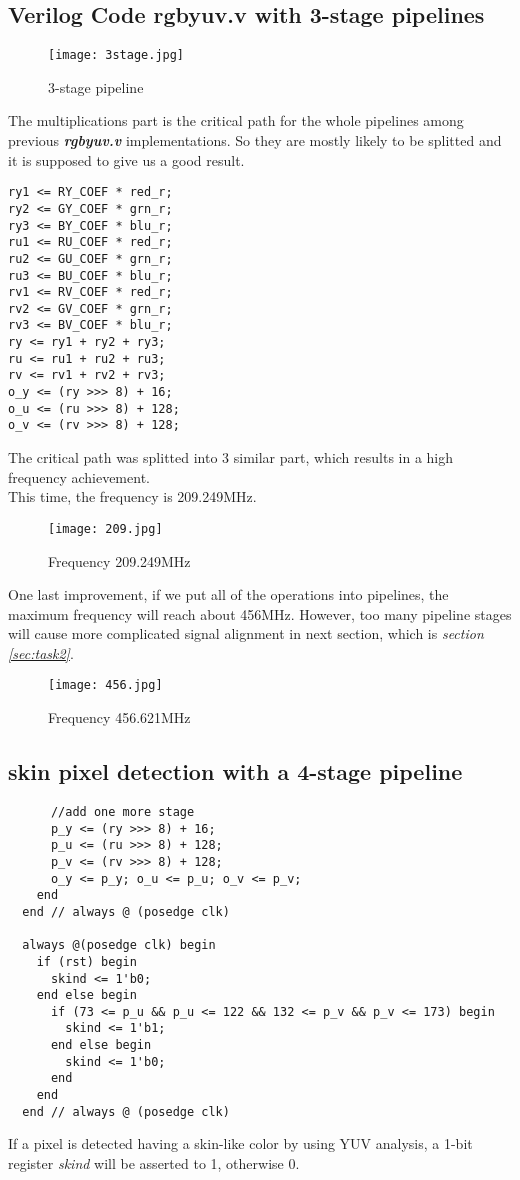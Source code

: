 \documentclass[12pt,fleqn]{article}
\begin{document}
\subsection{Verilog Code rgbyuv.v with 3-stage pipelines}
\begin{figure}[H]
\centering
\texttt{[image: 3stage.jpg]}
\caption{3-stage pipeline}
\end{figure}
The multiplications part is the critical path for the whole pipelines among previous \textbf{\emph{rgbyuv.v}} implementations. So they are mostly likely to be splitted and it is supposed to give us a good result.
{\linespread{0.75}
\begin{lstlisting}
ry1 <= RY_COEF * red_r;
ry2 <= GY_COEF * grn_r;
ry3 <= BY_COEF * blu_r;
ru1 <= RU_COEF * red_r;
ru2 <= GU_COEF * grn_r;
ru3 <= BU_COEF * blu_r;
rv1 <= RV_COEF * red_r;
rv2 <= GV_COEF * grn_r;
rv3 <= BV_COEF * blu_r;
ry <= ry1 + ry2 + ry3;
ru <= ru1 + ru2 + ru3;
rv <= rv1 + rv2 + rv3;
o_y <= (ry >>> 8) + 16;
o_u <= (ru >>> 8) + 128;
o_v <= (rv >>> 8) + 128;
\end{lstlisting}
\par}
The critical path was splitted into 3 similar part, which results in a high frequency achievement.\\
This time, the frequency is 209.249MHz.
\begin{figure}[H]
\centering
\texttt{[image: 209.jpg]}
\caption{Frequency 209.249MHz}
\end{figure}
One last improvement, if we put all of the operations into pipelines, the maximum frequency will reach about 456MHz. However, too many pipeline stages will cause more complicated signal alignment in next section, which is \emph{section \ref{sec:task2}}.
\begin{figure}[H]
\centering
\texttt{[image: 456.jpg]}
\caption{Frequency 456.621MHz}
\end{figure}

\subsection{skin pixel detection with a 4-stage pipeline}
{\linespread{0.75}
\begin{lstlisting}
      //add one more stage
      p_y <= (ry >>> 8) + 16;
      p_u <= (ru >>> 8) + 128;
      p_v <= (rv >>> 8) + 128;
      o_y <= p_y; o_u <= p_u; o_v <= p_v;
    end
  end // always @ (posedge clk)
  
  always @(posedge clk) begin
    if (rst) begin
      skind <= 1'b0;
    end else begin
      if (73 <= p_u && p_u <= 122 && 132 <= p_v && p_v <= 173) begin
        skind <= 1'b1;
      end else begin
        skind <= 1'b0;
      end
    end
  end // always @ (posedge clk)
\end{lstlisting}
\par}
If a pixel is detected having a skin-like color by using YUV analysis, a 1-bit register \emph{skind} will be asserted to 1, otherwise 0.
\end{document}

